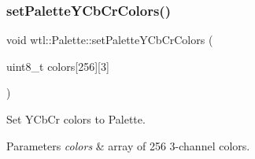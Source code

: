 \subsubsection{\texorpdfstring{set\+Palette\+Y\+Cb\+Cr\+Colors()}{setPaletteYCbCrColors()}}
{\footnotesize\ttfamily void wtl\+::\+Palette\+::set\+Palette\+Y\+Cb\+Cr\+Colors (\begin{DoxyParamCaption}\item[{uint8\+\_\+t}]{colors\mbox{[}256\mbox{]}\mbox{[}3\mbox{]} }\end{DoxyParamCaption})}



Set Y\+Cb\+Cr colors to Palette. 


\begin{DoxyParams}{Parameters}
{\em colors} & array of 256 3-\/channel colors. \\
\hline
\end{DoxyParams}
